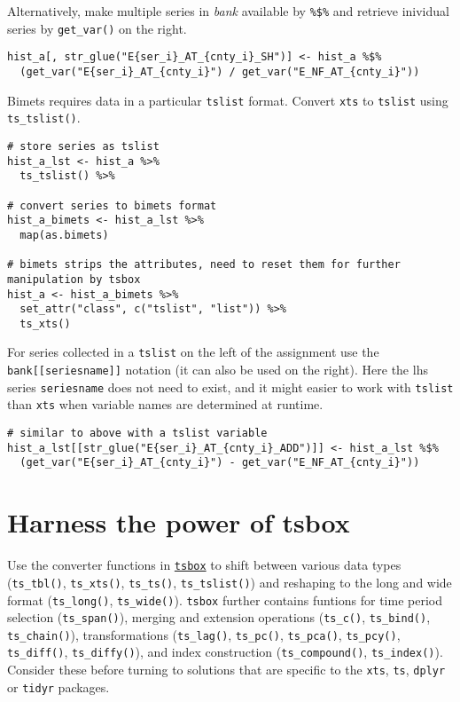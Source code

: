 \documentclass[
  letterpaper,
  DIV=11,
  numbers=noendperiod]{scrreport}
\begin{document}
Alternatively, make multiple series in \emph{bank} available by
\texttt{\%\$\%} and retrieve inividual series by \texttt{get\_var()} on
the right.

\begin{verbatim}
hist_a[, str_glue("E{ser_i}_AT_{cnty_i}_SH")] <- hist_a %$%
  (get_var("E{ser_i}_AT_{cnty_i}") / get_var("E_NF_AT_{cnty_i}"))
\end{verbatim}

Bimets requires data in a particular \texttt{tslist} format. Convert
\texttt{xts} to \texttt{tslist} using \texttt{ts\_tslist()}.

\begin{verbatim}
# store series as tslist
hist_a_lst <- hist_a %>% 
  ts_tslist() %>% 

# convert series to bimets format
hist_a_bimets <- hist_a_lst %>%
  map(as.bimets)

# bimets strips the attributes, need to reset them for further manipulation by tsbox
hist_a <- hist_a_bimets %>% 
  set_attr("class", c("tslist", "list")) %>% 
  ts_xts()
\end{verbatim}

For series collected in a \texttt{tslist} on the left of the assignment
use the \texttt{bank{[}{[}seriesname{]}{]}} notation (it can also be
used on the right). Here the lhs series \texttt{seriesname} does not
need to exist, and it might easier to work with \texttt{tslist} than
\texttt{xts} when variable names are determined at runtime.

\begin{verbatim}
# similar to above with a tslist variable
hist_a_lst[[str_glue("E{ser_i}_AT_{cnty_i}_ADD")]] <- hist_a_lst %$%
  (get_var("E{ser_i}_AT_{cnty_i}") - get_var("E_NF_AT_{cnty_i}"))
\end{verbatim}

\section{Harness the power of tsbox}\label{harness-the-power-of-tsbox}

Use the converter functions in
\href{https://www.tsbox.help/reference/index.html}{\texttt{tsbox}} to
shift between various data types (\texttt{ts\_tbl()},
\texttt{ts\_xts()}, \texttt{ts\_ts()}, \texttt{ts\_tslist()}) and
reshaping to the long and wide format (\texttt{ts\_long()},
\texttt{ts\_wide()}). \texttt{tsbox} further contains funtions for time
period selection (\texttt{ts\_span()}), merging and extension operations
(\texttt{ts\_c()}, \texttt{ts\_bind()}, \texttt{ts\_chain()}),
transformations (\texttt{ts\_lag()}, \texttt{ts\_pc()},
\texttt{ts\_pca()}, \texttt{ts\_pcy()}, \texttt{ts\_diff()},
\texttt{ts\_diffy()}), and index construction (\texttt{ts\_compound()},
\texttt{ts\_index()}). Consider these before turning to solutions that
are specific to the \texttt{xts}, \texttt{ts}, \texttt{dplyr} or
\texttt{tidyr} packages.
\end{document}
